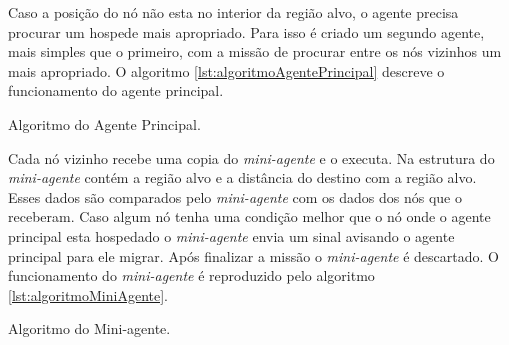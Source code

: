 Caso a posição do nó não esta no interior da região alvo, o agente precisa procurar um hospede mais apropriado. Para isso é criado um segundo agente, mais simples que o primeiro, com a missão de procurar entre os nós vizinhos um mais apropriado. O algoritmo \ref{lst:algoritmoAgentePrincipal} descreve o funcionamento do agente principal.

\begin{algorithm}
	\scriptsize
	\caption{Algoritmo do Agente Principal.}
	\label{lst:algoritmoAgentePrincipal}
\end{algorithm}

Cada nó vizinho recebe uma copia do \emph{mini-agente} e o executa. Na estrutura do \emph{mini-agente} contém a região alvo e a distância do destino com a região alvo. Esses dados são comparados pelo \emph{mini-agente} com os dados dos nós que o receberam. Caso algum nó tenha uma condição melhor que o nó onde o agente principal esta hospedado o \emph{mini-agente} envia um sinal avisando o agente principal para ele migrar. Após finalizar a missão o \emph{mini-agente} é descartado. O funcionamento do \emph{mini-agente} é reproduzido pelo algoritmo \ref{lst:algoritmoMiniAgente}.

\begin{algorithm}
	\scriptsize
	\caption{Algoritmo do Mini-agente.}
	\label{lst:algoritmoMiniAgente}
\end{algorithm}

